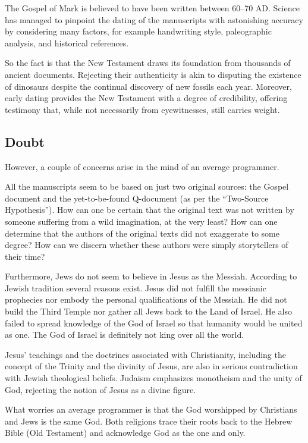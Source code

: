 The Gospel of Mark is believed to have been written between
60--70 AD. Science has managed to pinpoint the dating of the
manuscripts with astonishing accuracy by considering many
factors, for example handwriting style, paleographic analysis,
and historical references.

So the fact is that the New Testament draws its foundation from
thousands of ancient documents. Rejecting their authenticity is
akin to disputing the existence of dinosaurs despite the
continual discovery of new fossils each year. Moreover, early
dating provides the New Testament with a degree of credibility,
offering testimony that, while not necessarily from eyewitnesses,
still carries weight.

\subsection*{Doubt}

However, a couple of concerns arise in the mind of an average
programmer.

All the manuscripts seem to be based on just two original
sources: the Gospel document and the yet-to-be-found Q-document
(as per the ``Two-Source Hypothesis''). How can one be certain
that the original text was not written by someone suffering from
a wild imagination, at the very least? How can one determine that
the authors of the original texts did not exaggerate to some
degree? How can we discern whether these authors were simply
storytellers of their time?

Furthermore, Jews do not seem to believe in Jesus as the Messiah.
According to Jewish tradition several reasons exist. Jesus did
not fulfill the messianic prophecies nor embody the personal
qualifications of the Messiah. He did not build the Third Temple
nor gather all Jews back to the Land of Israel. He also failed to
spread knowledge of the God of Israel so that humanity would be
united as one. The God of Israel is definitely not king over all
the world.

Jesus' teachings and the doctrines associated with Christianity,
including the concept of the Trinity and the divinity of Jesus,
are also in serious contradiction with Jewish theological
beliefs. Judaism emphasizes monotheism and the unity of God,
rejecting the notion of Jesus as a divine figure.

What worries an average programmer is that the God worshipped by
Christians and Jews is the same God. Both religions trace their
roots back to the Hebrew Bible (Old Testament) and acknowledge
God as the one and only.


